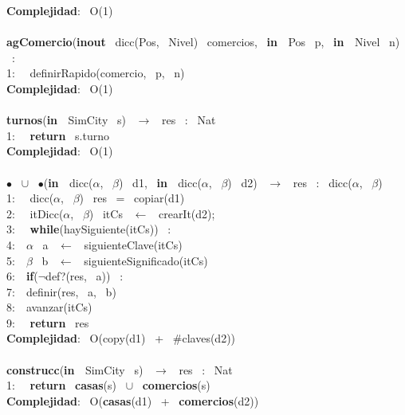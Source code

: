 \begin{Algoritmos}
    \textbf{Complejidad}: \ O(1)\\
    \noindent\makebox[\linewidth]{\rule{\textwidth}{0.4pt}}
    \\
    \noindent\makebox[\linewidth]{\rule{\textwidth}{0.4pt}}
    \textbf{agComercio}(\textbf{inout} \ dicc(Pos, \ Nivel) \ comercios, \ \textbf{in \ }Pos \ p, \ \textbf{in \ }Nivel \ n) \ :\\
    1: \  \ definirRapido(comercio, \ p, \ n)\\
    \textbf{Complejidad}: \ O(1)\\
    \noindent\makebox[\linewidth]{\rule{\textwidth}{0.4pt}}
    \\
    \noindent\makebox[\linewidth]{\rule{\textwidth}{0.4pt}}
    \textbf{turnos}(\textbf{in \ }SimCity \ s) \ $\rightarrow $ \ res \ : \ Nat\\
    1: \  \ \textbf{return} \ s.turno\\
    \textbf{Complejidad}: \ O(1)\\
    \noindent\makebox[\linewidth]{\rule{\textwidth}{0.4pt}}
    \\
    \noindent\makebox[\linewidth]{\rule{\textwidth}{0.4pt}}
    $\bullet$ \ $\cup$ \ $\bullet$(\textbf{in \ }dicc($\alpha$, \ $\beta$) \ d1, \ \textbf{in \ }dicc($\alpha$, \ $\beta$) \ d2) \ $\rightarrow $ \ res \ : \ dicc($\alpha$, \ $\beta$)\\
    1: \  \ dicc($\alpha$, \ $\beta$) \ res \ = \ copiar(d1)\\
    2: \  \ itDicc($\alpha$, \ $\beta$) \ itCs \ $\leftarrow$ \ crearIt(d2);\\
    3: \  \ \textbf{while}(haySiguiente(itCs)) \ :\\
    4:\indent  \  \ $\alpha$ \ a \ $\leftarrow$ \ siguienteClave(itCs)\\
    5:\indent  \  \ $\beta$ \ b \ $\leftarrow$ \ siguienteSignificado(itCs)\\
    6:\indent  \  \ \textbf{if}($\neg$def?(res, \ a)) \ :\\
    7:\indent \indent  \  \ definir(res, \ a, \ b)\\
    8:\indent  \  \ avanzar(itCs)\\
    9: \  \ \textbf{return} \ res\\
    \textbf{Complejidad}: \ O(copy(d1) \ + \ $ \# $claves(d2))\\
    \noindent\makebox[\linewidth]{\rule{\textwidth}{0.4pt}}
    \\
    \noindent\makebox[\linewidth]{\rule{\textwidth}{0.4pt}}
    \textbf{construcc}(\textbf{in \ }SimCity \ s) \ $\rightarrow $ \ res \ : \ Nat\\
    1: \  \ \textbf{return} \ \textbf{casas}(s) \ $\cup$ \ \textbf{comercios}(s)\\
    \textbf{Complejidad}: \ O(\textbf{casas}(d1) \ + \ \textbf{comercios}(d2))\\
    \noindent\makebox[\linewidth]{\rule{\textwidth}{0.4pt}}
    \\    
\end{Algoritmos}

